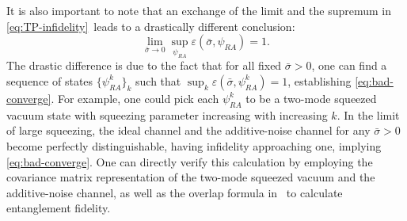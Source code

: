 \documentclass[apsrev,twocolumn]{revtex4-1}%
\begin{document}
It is also important to note that an exchange of the limit and the supremum in
\eqref{eq:TP-infidelity}\ leads to a drastically different conclusion:%
\begin{equation}
\lim_{\bar{\sigma}\rightarrow0}\sup_{\psi_{RA}}\varepsilon(\bar{\sigma}%
,\psi_{RA})=1. \label{eq:bad-converge}%
\end{equation}
The drastic difference is due to the fact that for all fixed $\bar{\sigma}>0$,
one can find a sequence of states $\{\psi_{RA}^{k}\}_{k}$ such that $\sup
_{k}\varepsilon(\bar{\sigma},\psi_{RA}^{k})=1$, establishing
\eqref{eq:bad-converge}. For example, one could pick each $\psi_{RA}^{k}$ to
be a two-mode squeezed vacuum state with squeezing parameter increasing with
increasing $k$. In the limit of large squeezing, the ideal channel and the
additive-noise channel for any $\bar{\sigma}>0$ become perfectly
distinguishable, having infidelity approaching one, implying
\eqref{eq:bad-converge}. One can directly verify this calculation by employing
the covariance matrix representation of the two-mode squeezed vacuum and the
additive-noise channel, as well as the overlap formula in \cite[Eq.~(4.51)]%
{S17}\ to calculate entanglement fidelity.
\end{document}
